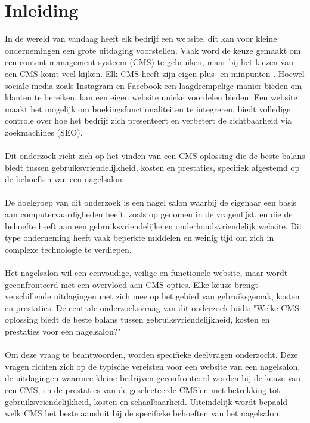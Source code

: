 
\section{Inleiding}%
\label{sec:inleiding}
\noindent
In de wereld van vandaag heeft elk bedrijf een website, dit kan voor kleine ondernemingen een grote uitdaging voorstellen. Vaak word de keuze gemaakt om een content management systeem (CMS) te gebruiken, maar bij het kiezen van een CMS komt veel kijken. Elk CMS heeft zijn eigen plus- en minpunten \autocite{Khalil2024}. Hoewel sociale media zoals Instagram en Facebook een laagdrempelige manier bieden om klanten te bereiken, kan een eigen website unieke voordelen bieden. Een website maakt het mogelijk om boekingsfunctionaliteiten te integreren, biedt volledige controle over hoe het bedrijf zich presenteert en verbetert de zichtbaarheid via zoekmachines (SEO).
\\ \\
Dit onderzoek richt zich op het vinden van een CMS-oplossing die de beste balans biedt tussen gebruiksvriendelijkheid, kosten en prestaties, specifiek afgestemd op de behoeften van een nagelsalon.
\\ \\
De doelgroep van dit onderzoek is een nagel salon waarbij de eigenaar een basis aan computervaardigheden heeft, zoals op genomen in de vragenlijst, en die de behoefte heeft aan een gebruiksvriendelijke en onderhoudsvriendelijk website. Dit type onderneming heeft vaak beperkte middelen en weinig tijd om zich in complexe technologie te verdiepen.
\\ \\
Het nagelsalon wil een eenvoudige, veilige en functionele website, maar wordt geconfronteerd met een overvloed aan CMS-opties. Elke keuze brengt verschillende uitdagingen met zich mee op het gebied van gebruiksgemak, kosten en prestaties. De centrale onderzoeksvraag van dit onderzoek luidt: "Welke CMS-oplossing biedt de beste balans tussen gebruiksvriendelijkheid, kosten en prestaties voor een nagelsalon?"
\\ \\
Om deze vraag te beantwoorden, worden specifieke deelvragen onderzocht. Deze vragen richten zich op de typische vereisten voor een website van een nagelsalon, de uitdagingen waarmee kleine bedrijven geconfronteerd worden bij de keuze van een CMS, en de prestaties van de geselecteerde CMS’en met betrekking tot gebruiksvriendelijkheid, kosten en schaalbaarheid. Uiteindelijk wordt bepaald welk CMS het beste aansluit bij de specifieke behoeften van het nagelsalon.
